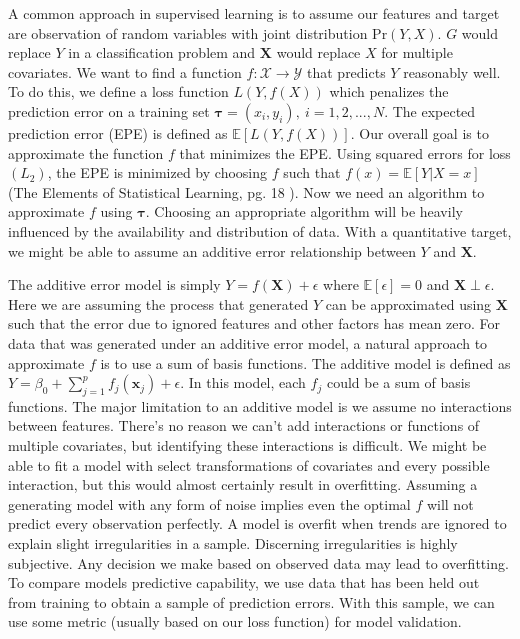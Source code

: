 \documentclass[
  12pt,
  letterpaper,
  DIV=11,
  numbers=noendperiod]{scrartcl}
\newcommand{\bm}{\mathbf}
\begin{document}
A common approach in supervised learning is to assume our features and
target are observation of random variables with joint distribution
\(\text{Pr}(Y,X)\). \(G\) would replace \(Y\) in a classification
problem and \(\bm X\) would replace \(X\) for multiple covariates. We
want to find a function \(f:\mathcal{X}\rightarrow\mathcal{Y}\) that
predicts \(Y\) reasonably well. To do this, we define a loss function
\(L(Y,f(X))\) which penalizes the prediction error on a training set
\(\boldsymbol \tau=(x_i,y_i),\ i=1,2,...,N\). The expected prediction
error (EPE) is defined as \(\mathbb{E}[L(Y,f(X))]\). Our overall goal is
to approximate the function \(f\) that minimizes the EPE. Using squared
errors for loss \((L_2)\), the EPE is minimized by choosing \(f\) such
that \(f(x)=\mathbb{E}[Y|X=x]\) (The Elements of Statistical Learning,
pg. 18 \citep{esl}). Now we need an algorithm to approximate \(f\) using
\(\boldsymbol \tau\). Choosing an appropriate algorithm will be heavily
influenced by the availability and distribution of data. With a
quantitative target, we might be able to assume an additive error
relationship between \(Y\) and \(\bm X\).

The additive error model is simply \(Y=f(\bm X)+\epsilon\) where
\(\mathbb{E}[\epsilon]=0\) and \(\bm X\perp\epsilon\). Here we are
assuming the process that generated \(Y\) can be approximated using
\(\bm X\) such that the error due to ignored features and other factors
has mean zero. For data that was generated under an additive error
model, a natural approach to approximate \(f\) is to use a sum of basis
functions. The additive model is defined as
\(Y=\beta_0+\sum_{j=1}^pf_j(\bm x_j)+\epsilon\). In this model, each
\(f_j\) could be a sum of basis functions. The major limitation to an
additive model is we assume no interactions between features. There's no
reason we can't add interactions or functions of multiple covariates,
but identifying these interactions is difficult. We might be able to fit
a model with select transformations of covariates and every possible
interaction, but this would almost certainly result in overfitting.
Assuming a generating model with any form of noise implies even the
optimal \(f\) will not predict every observation perfectly. A model is
overfit when trends are ignored to explain slight irregularities in a
sample. Discerning irregularities is highly subjective. Any decision we
make based on observed data may lead to overfitting. To compare models
predictive capability, we use data that has been held out from training
to obtain a sample of prediction errors. With this sample, we can use
some metric (usually based on our loss function) for model validation.
\end{document}
